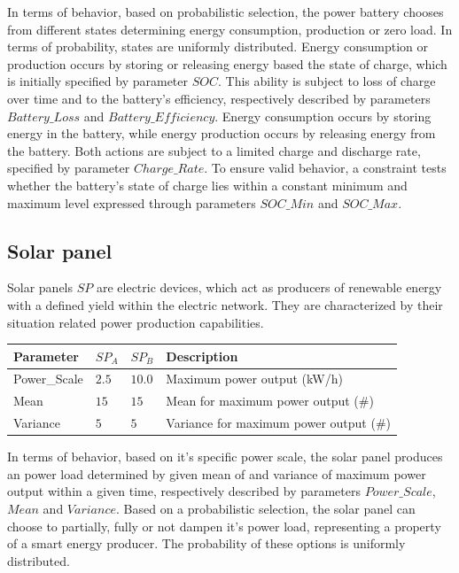In terms of behavior, based on probabilistic selection, the power battery chooses from different states determining energy consumption, production or zero load. In terms of probability, states are uniformly distributed. Energy consumption or production occurs by storing or releasing energy based the state of charge, which is initially specified by parameter $SOC$. This ability is subject to loss of charge over time and to the battery's efficiency, respectively described by parameters $Battery\_Loss$ and $Battery\_Efficiency$.
Energy consumption occurs by storing energy in the battery, while energy production occurs by releasing energy from the battery. Both actions are subject to a limited charge and discharge rate, specified by parameter $Charge\_Rate$. To ensure valid behavior, a constraint tests whether the battery's state of charge lies within a constant minimum and maximum level expressed through parameters $SOC\_Min$ and $SOC\_Max$.

\subsection{Solar panel}

Solar panels $SP$ are electric devices, which act as producers of renewable energy with a defined yield within the electric network. They are characterized by their situation related power production capabilities. 

\begin{table}[h]
	\renewcommand{\arraystretch}{1.3}
	\centering
	\begin{tabularx}{\columnwidth}{lllX}
		\hline
		\textbf{Parameter}                     & \textbf{$SP_{A}$} & \textbf{$SP_{B}$} & \textbf{Description} \\ \hline
		Power\_Scale                       	   & $2.5$ & $10.0$ & Maximum power output (kW/h) \\
		Mean                       	  		  & $15$ & $15$ & Mean for maximum power output (\#) \\
		Variance                       	       & $5$ & $5$ & Variance for maximum power output (\#) \\ \hline
	\end{tabularx}
\end{table}

In terms of behavior, based on it's specific power scale, the solar panel produces an power load determined by given mean of and variance of maximum power output within a given time, respectively described by parameters $Power\_Scale$, $Mean$ and $Variance$. Based on a probabilistic selection, the solar panel can choose to partially, fully or not dampen it's power load, representing a property of a smart energy producer. The probability of these options is uniformly distributed.

